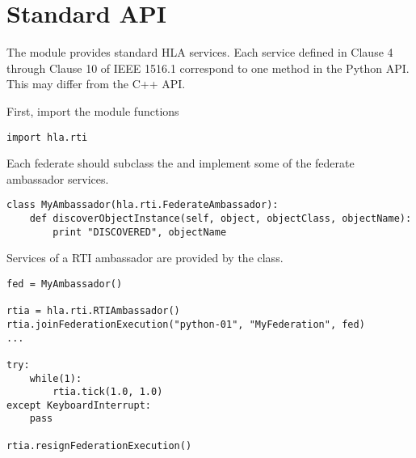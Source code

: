 \section{Standard API}

The  module provides standard HLA services.
Each service defined in Clause 4 through Clause 10 of IEEE 1516.1 correspond to
one method in the Python API. This may differ from the C++ API.

First, import the module functions
\begin{verbatim}
import hla.rti
\end{verbatim}

Each federate should subclass the  and implement some
of the federate ambassador services.
\begin{verbatim}
class MyAmbassador(hla.rti.FederateAmbassador):
    def discoverObjectInstance(self, object, objectClass, objectName):
        print "DISCOVERED", objectName
\end{verbatim}

Services of a RTI ambassador are provided by the  class.

\begin{verbatim}
fed = MyAmbassador()

rtia = hla.rti.RTIAmbassador()
rtia.joinFederationExecution("python-01", "MyFederation", fed)
...

try:
    while(1):
        rtia.tick(1.0, 1.0)
except KeyboardInterrupt:
    pass

rtia.resignFederationExecution()
\end{verbatim}




